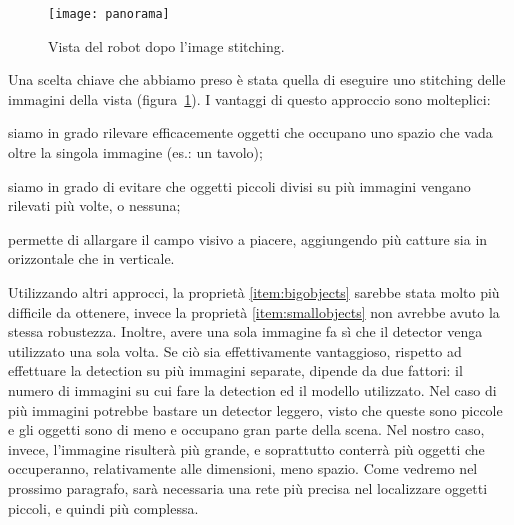 \begin{figure}
	\centering
	\texttt{[image: panorama]}
	\caption{Vista del robot dopo l'image stitching.}\label{fig:panorama}
\end{figure}

Una scelta chiave che abbiamo preso è stata quella di eseguire uno stitching delle immagini della vista (figura~\ref{fig:panorama}). I vantaggi di questo approccio sono molteplici: \begin{enumerate*}[label={(\arabic*)}] \item siamo in grado rilevare efficacemente oggetti che occupano uno spazio che vada oltre la singola immagine (es.\@: un tavolo)\label{item:bigobjects}; \item siamo in grado di evitare che oggetti piccoli divisi su più immagini vengano rilevati più volte, o nessuna\label{item:smallobjects}; \item permette di allargare il campo visivo a piacere, aggiungendo più catture sia in orizzontale che in verticale.\end{enumerate*} Utilizzando altri approcci, la proprietà \ref{item:bigobjects} sarebbe stata molto più difficile da ottenere, invece la proprietà \ref{item:smallobjects} non avrebbe avuto la stessa robustezza. \label{sec:master_small_img}Inoltre, avere una sola immagine fa sì che il detector venga utilizzato una sola volta. Se ciò sia effettivamente vantaggioso, rispetto ad effettuare la detection su più immagini separate, dipende da due fattori: il numero di immagini su cui fare la detection ed il modello utilizzato. Nel caso di più immagini potrebbe bastare un detector leggero, visto che queste sono piccole e gli oggetti sono di meno e occupano gran parte della scena. Nel nostro caso, invece, l'immagine risulterà più grande, e soprattutto conterrà più oggetti che occuperanno, relativamente alle dimensioni, meno spazio. Come vedremo nel prossimo paragrafo, sarà necessaria una rete più precisa nel localizzare oggetti piccoli, e quindi più complessa.